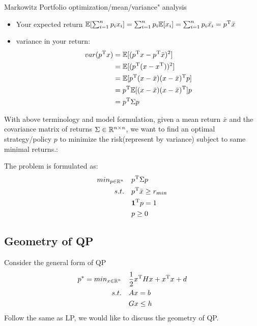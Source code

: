 \begin{example}{Markowitz Portfolio optimization/mean/variance" analysis}
\begin{itemize}
		\item Your expected return $\mathbb{E}[\sum^n_{i=1}p_ix_i] = \sum^n_{i=1}p_i\mathbb{E}[x_i] = \sum^n_{i=1}p_i\bar{x_i} = p^{{\rm T}}\bar{x}$
		
		\item variance in your return:
		\begin{align*}
		var(p^{{\rm T}}x) &=\mathbb{E}[(p^{{\rm T}}x - p^{{\rm T}}\bar{x})^2]\\
		&= \mathbb{E}[(p^{{\rm T}}(x - x^{{\rm T}}))^2]\\
		&= \mathbb{E}[p^{{\rm T}}(x - \bar{x})(x - \bar{x})^{{\rm T}}p]\\
		&= p^{{\rm T}}\mathbb{E}[(x - \bar{x})(x - \bar{x})^{{\rm T}}]p\\
		&= p^{{\rm T}}\Sigma p
		\end{align*}
	\end{itemize}
	
	
	With above terminology and model formulation, given a mean return $\bar{x}$ and the covariance matrix of returns $\Sigma \in \mathbb{R}^{n\times n}$, we want to find an optimal strategy/policy $p$ to minimize the risk(represent by variance) subject to same minimal returns.: 
	
	The problem is formulated as:
	\begin{align*}
	min_{p\in \mathbb{R}^n}\quad &p^{{\rm T}}\Sigma p\\
	s.t. \quad&p^{{\rm T}}\bar{x}\geq r_{min}\\
	&\textbf{1}^{{\rm T}}p = 1\\
	&p\geq 0
	\end{align*}
\end{example}



\subsection{Geometry of QP}
Consider the general form of QP
\begin{align*}
p^* = min_{x\in \mathbb{R}^n}\quad &\frac{1}{2}x^{{\rm T}}Hx + x^{{\rm T}}x + d\\
s.t.\quad &Ax = b\\
&Gx\leq h
\end{align*}
Follow the same as LP, we would like to discuss the geometry of QP.

